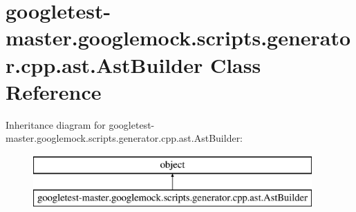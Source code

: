 \hypertarget{classgoogletest-master_1_1googlemock_1_1scripts_1_1generator_1_1cpp_1_1ast_1_1_ast_builder}{}\section{googletest-\/master.googlemock.\+scripts.\+generator.\+cpp.\+ast.\+Ast\+Builder Class Reference}
\label{classgoogletest-master_1_1googlemock_1_1scripts_1_1generator_1_1cpp_1_1ast_1_1_ast_builder}
Inheritance diagram for googletest-\/master.googlemock.\+scripts.\+generator.\+cpp.\+ast.\+Ast\+Builder\+:\begin{figure}[H]
\begin{center}
\leavevmode
\includegraphics[height=2.000000cm]{d7/d31/classgoogletest-master_1_1googlemock_1_1scripts_1_1generator_1_1cpp_1_1ast_1_1_ast_builder}
\end{center}
\end{figure}
